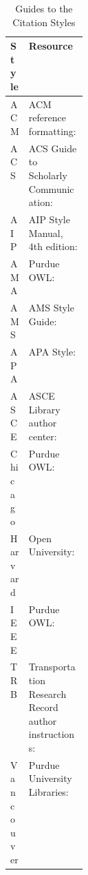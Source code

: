 \begin{table}
\centering
\caption{Guides to the Citation Styles}
\label{tab:style-resources}
\begin{tabularx}{\linewidth}{>{\raggedright\arraybackslash}p{0.13\linewidth}>{\raggedright\arraybackslash}X}
\toprule
\textbf{Style} & \textbf{Resource} \\
\midrule
ACM & ACM reference formatting:\newline {\small\url{https://www.acm.org/publications/authors/reference-formatting}} \\
\addlinespace
ACS & ACS Guide to Scholarly Communication:\newline {\small\url{https://pubs.acs.org/books/pages/acsguide}} \\
\addlinespace
AIP & AIP Style Manual, 4th edition:\newline {\small\url{https://publishing.aip.org/wp-content/uploads/2021/03/AIP_Style_4thed.pdf}} \\
\addlinespace
AMA & Purdue OWL:\newline {\small\url{https://owl.purdue.edu/owl/research_and_citation/ama_style/index.html}} \\
\addlinespace
AMS & AMS Style Guide:\newline {\small\url{https://www.ams.org/publications/authors/AMS-StyleGuide-online.pdf}} \\
\addlinespace
APA & APA Style:\newline {\small\url{https://apastyle.apa.org}} \\
\addlinespace
ASCE & ASCE Library author center:\newline {\small\url{https://ascelibrary.org/author-center/preparing-manuscript}} \\
\addlinespace
Chicago & Purdue OWL:\newline {\small\url{https://owl.purdue.edu/owl/research_and_citation/chicago_manual_17th_edition/chicago_style_introduction.html}} \\
\addlinespace
Harvard & Open University:\newline {\small\url{https://university.open.ac.uk/library/referencing-and-plagiarism/quick-guide-to-harvard-referencing-cite-them-right}} \\
\addlinespace
IEEE & Purdue OWL:\newline {\small\url{https://owl.purdue.edu/owl/research_and_citation/ieee_style/ieee_overview.html}} \\
\addlinespace
TRB & Transportation Research Record author instructions:\newline {\small\url{https://trb.secure-platform.com/a/page/trrjournal/forauthors}} \\
\addlinespace
Vancouver & Purdue University Libraries:\newline {\small\url{https://guides.lib.purdue.edu/BMEQual/VancouverStyle}} \\
\bottomrule
\end{tabularx}
\end{table}

